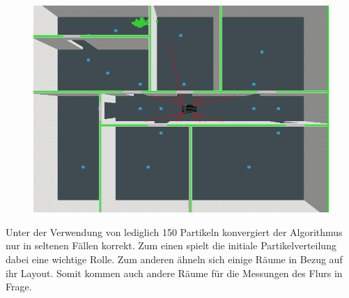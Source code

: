 \documentclass{../Vorlage/mat}
\begin{document}
\begin{figure}[!htbp]
\begin{minipage}{.5\textwidth}
  \centering
  \includegraphics[scale=0.25]{1_150_schlecht_nach_13.png}
  \label{fig3}
\end{minipage}%
\begin{minipage}{.5\textwidth}
\end{minipage}
\end{figure}

Unter der Verwendung von lediglich 150 Partikeln konvergiert der Algorithmus nur in seltenen Fällen korrekt. Zum einen spielt die initiale Partikelverteilung dabei eine wichtige Rolle. Zum anderen ähneln sich einige Räume in Bezug auf ihr Layout. Somit kommen auch andere Räume für die Messungen des Flurs in Frage.
\newpage
\end{document}
